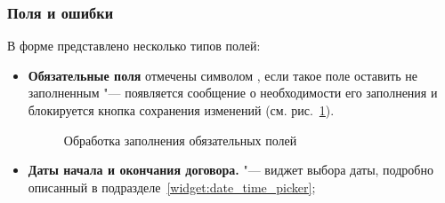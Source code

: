 \subsubsection{Поля и ошибки}
В форме представлено несколько типов полей:
	\begin{itemize}
		\item \textbf{Обязательные поля} отмечены символом \quotes{*}, если такое поле оставить не заполненным "--- появляется сообщение о необходимости его заполнения и блокируется кнопка сохранения изменений (см. рис.~\ref{agreement:edit_required}).
		
		\begin{figure}[H]
		\caption{Обработка заполнения обязательных полей}
		\label{agreement:edit_required}
		\end{figure}	
		
		\item \textbf{Даты начала и окончания договора.} "--- виджет выбора даты, подробно описанный в подразделе~\ref{widget:date_time_picker};
	\end{itemize} 
		
